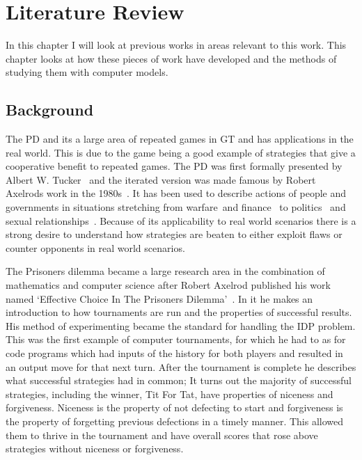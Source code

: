 
\chapter{Literature Review}\label{ch:literature}
In this chapter I will look at previous works in areas relevant to this work.
This chapter looks at how these pieces of work have developed and the methods of studying them with computer models. 

\section{Background}\label{sec:background}
The PD and its a large area of repeated games in GT and has applications in the real world.
This is due to the game being a good example of strategies that give a cooperative benefit to repeated games.
The PD was first formally presented by Albert W. Tucker~\cite{cambell2016thesis, gass2005annotated} and the iterated version was made famous by Robert Axelrods work in the 1980s~\cite{axelrod1980effective}.
It has been used to describe actions of people and governments in situations stretching from warfare~\cite{tooby1988war,aumann1992handbook}and finance~\cite{cable1997finance} to politics~\cite{snidal1985Politics} and sexual relationships~\cite{low2015sex}.
Because of its applicability to real world scenarios there is a strong desire to understand how strategies are beaten to either exploit flaws or counter opponents in real world scenarios.

The Prisoners dilemma became a large research area in the combination of mathematics and computer science after Robert Axelrod published his work named `Effective Choice In The Prisoners Dilemma'~\cite{axelrod1980effective}.
In it he makes an introduction to how tournaments are run and the properties of successful results.
His method of experimenting became the standard for handling the IDP problem.
This was the first example of computer tournaments, for which he had to as for code programs which had inputs of the history for both players and resulted in an output move for that next turn.
After the tournament is complete he describes what successful strategies had in common; 
It turns out the majority of successful strategies, including the winner, Tit For Tat, have properties of niceness and forgiveness.
Niceness is the property of not defecting to start and forgiveness is the property of forgetting previous defections in a timely manner.
This allowed them to thrive in the tournament and have overall scores that rose above strategies without niceness or forgiveness.

